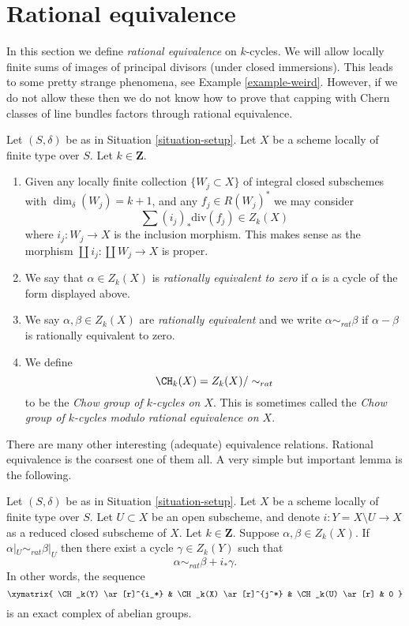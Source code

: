 \section{Rational equivalence}
\label{section-rational-equivalence}

\noindent
In this section we define {\it rational equivalence} on $k$-cycles.
We will allow locally finite sums of images of
principal divisors (under closed immersions). This leads to some
pretty strange phenomena, see Example \ref{example-weird}.
However, if we do not allow these then we do not know how to prove that
capping with Chern classes of line bundles factors through rational
equivalence.

\begin{definition}
\label{definition-rational-equivalence}
Let $(S, \delta)$ be as in Situation \ref{situation-setup}.
Let $X$ be a scheme locally of finite type over $S$.
Let $k \in \mathbf{Z}$.
\begin{enumerate}
\item Given any locally finite collection $\{W_j \subset X\}$
of integral closed subschemes with $\dim_\delta(W_j) = k + 1$,
and any $f_j \in R(W_j)^*$ we may consider
$$
\sum (i_j)_*\text{div}(f_j) \in Z_k(X)
$$
where $i_j : W_j \to X$ is the inclusion morphism.
This makes sense as the morphism
$\coprod i_j : \coprod W_j \to X$ is proper.
\item We say that $\alpha \in Z_k(X)$ is {\it rationally equivalent to zero}
if $\alpha$ is a cycle of the form displayed above.
\item We say $\alpha, \beta \in Z_k(X)$ are
{\it rationally equivalent} and we write $\alpha \sim_{rat} \beta$
if $\alpha - \beta$ is rationally equivalent to zero.
\item We define
$$
\CH_k(X) = Z_k(X) / \sim_{rat}
$$
to be the {\it Chow group of $k$-cycles on $X$}. This is sometimes called
the {\it Chow group of $k$-cycles modulo rational equivalence on $X$}.
\end{enumerate}
\end{definition}

\noindent
There are many other interesting (adequate) equivalence relations.
Rational equivalence is the coarsest one of them all.
A very simple but important lemma is the following.

\begin{lemma}
\label{lemma-restrict-to-open}
Let $(S, \delta)$ be as in Situation \ref{situation-setup}.
Let $X$ be a scheme locally of finite type over $S$.
Let $U \subset X$ be an open subscheme, and denote
$i : Y = X \setminus U \to X$ as a reduced closed subscheme of $X$.
Let $k \in \mathbf{Z}$.
Suppose $\alpha, \beta \in Z_k(X)$.
If $\alpha|_U \sim_{rat} \beta|_U$ then there exist a cycle
$\gamma \in Z_k(Y)$ such that
$$
\alpha \sim_{rat} \beta + i_*\gamma.
$$
In other words, the sequence
$$
\xymatrix{
\CH_k(Y) \ar[r]^{i_*} & \CH_k(X) \ar[r]^{j^*} & \CH_k(U) \ar[r] & 0
}
$$
is an exact complex of abelian groups.
\end{lemma}

